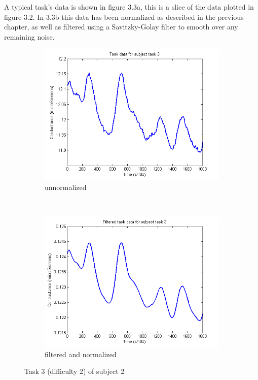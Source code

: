 \documentclass[11pt,leqno,a4paper]{report} %
\begin{document}
A typical task's data is shown in figure 3.3a, this is a slice of the data plotted in figure 3.2. In 3.3b this data has been normalized as described in the previous chapter, as well as filtered using a Savitzky-Golay filter to smooth over any remaining noise.


\begin{figure}[h!]
\hspace*{-.2\textwidth}        \centering
        \begin{subfigure}[b]{0.7\textwidth}
                \includegraphics[width=\textwidth]{measurements/singletaskunnormal.png}
                \caption{unnormalized}
                \label{fig:singleunnormal}
        \end{subfigure}%
        ~ %
        \begin{subfigure}[b]{0.7\textwidth}
                \includegraphics[width=\textwidth]{measurements/singletaskfilt.png}
                \caption{filtered and normalized}
                \label{fig:singlefiltered}
        \end{subfigure}
        \caption{Task 3 (difficulty 2) of subject 2}\label{fig:animals}
\end{figure}
\end{document}
